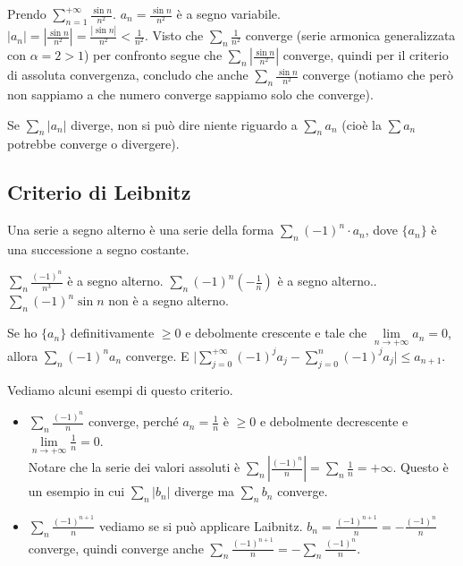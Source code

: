 \begin{example}
Prendo $\sum_{n=1}^{+\infty}\frac{\sin{n}}{n^2}$. $a_n = \frac{\sin{n}}{n^2}$ è a segno variabile. \\
$|a_n| = |\frac{\sin{n}}{n^2}| = \frac{|\sin{n}|}{n^2} < \frac{1}{n^2}$. Visto che $\sum_n \frac{1}{n^2}$ converge (serie armonica generalizzata con $\alpha = 2 > 1$) per confronto segue che $\sum_n |\frac{\sin{n}}{n^2}|$ converge, quindi per il criterio di assoluta convergenza, concludo che anche $\sum_n \frac{\sin{n}}{n^2}$ converge (notiamo che però non sappiamo a che numero converge sappiamo solo che converge).
\end{example}

\begin{observation}
Se $\sum_n |a_n|$ diverge, non si può dire niente riguardo a $\sum_n a_n$ (cioè la $\sum a_n$ potrebbe converge o divergere).
\end{observation}

\subsection{Criterio di Leibnitz}
\begin{definition}
Una serie a segno alterno è una serie della forma $\sum_n (-1)^n \cdot a_n$, dove $\{a_n\}$ è una successione a segno costante.
\end{definition}

\begin{example}
$\sum_n \frac{(-1)^n}{n^3}$ è a segno alterno. $\sum_n (-1)^n(-\frac{1}{n})$ è a segno alterno.. $\sum_n (-1)^n \sin{n}$ non è a segno alterno.
\end{example}

\begin{theorem}
Se ho $\{a_n\}$ definitivamente $\geq 0$ e debolmente crescente e tale che $\lim\limits_{n\to +\infty}a_n = 0$, allora $\sum_n (-1)^n a_n$ converge.
E $\big|\sum_{j=0}^{+\infty}(-1)^ja_j - \sum_{j=0}^{n}(-1)^j a_j \big| \leq a_{n+1}$.
\end{theorem}

\begin{example}
Vediamo alcuni esempi di questo criterio.
\begin{itemize}
    \item $\sum_n \frac{(-1)^n}{n}$ converge, perché $a_n = \frac{1}{n}$ è $\geq 0$ e debolmente decrescente e $\lim\limits_{n\to +\infty}\frac{1}{n} = 0$.\\
    Notare che la serie dei valori assoluti è $\sum_n |\frac{(-1)^n}{n}| = \sum_n \frac{1}{n} = +\infty$. Questo è un esempio in cui $\sum_n |b_n|$ diverge ma $\sum_n b_n$ converge.
    \item $\sum_n \frac{(-1)^{n+1}}{n}$ vediamo se si può applicare Laibnitz. $b_n = \frac{(-1)^{n+1}}{n} = -\frac{(-1)^n }{n}$ converge, quindi converge anche $\sum_n \frac{(-1)^{n+1}}{n} = -\sum_n \frac{(-1)^n}{n}$.
\end{itemize}
\end{example}

